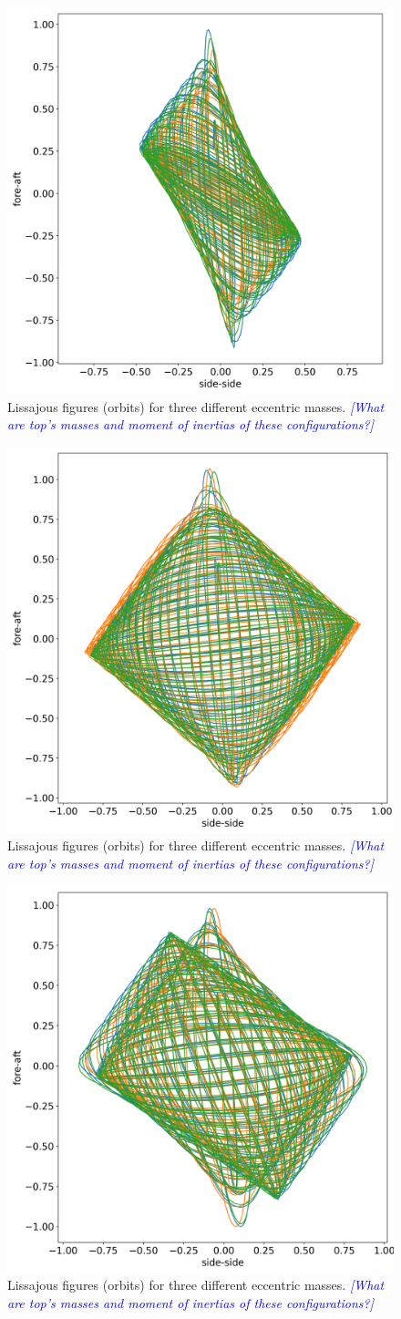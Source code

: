 \documentclass{article}
\newcommand{\andy}[1]{\textcolor{blue}{\emph{#1}}}
\begin{document}
\begin{figure}
    \centering
    \includegraphics[width=0.5\linewidth]{results/experiment/low_mass_orbit.png}
    \caption{Lissajous figures (orbits) for three different eccentric masses. \andy{[What are top's masses and moment of inertias of these configurations?]}}
    \label{fig:low-mass-orbit}
\end{figure}

\begin{figure}
    \centering
    \includegraphics[width=0.5\linewidth]{results/experiment/medium_mass_orbit.png}
    \caption{Lissajous figures (orbits) for three different eccentric masses. \andy{[What are top's masses and moment of inertias of these configurations?]}}
    \label{fig:medium-mass-orbit}
\end{figure}

\begin{figure}
    \centering
    \includegraphics[width=0.5\linewidth]{results/experiment/high_mass_orbit.png}
    \caption{Lissajous figures (orbits) for three different eccentric masses. \andy{[What are top's masses and moment of inertias of these configurations?]}}
    \label{fig:high-mass-orbit}
\end{figure}
\end{document}
